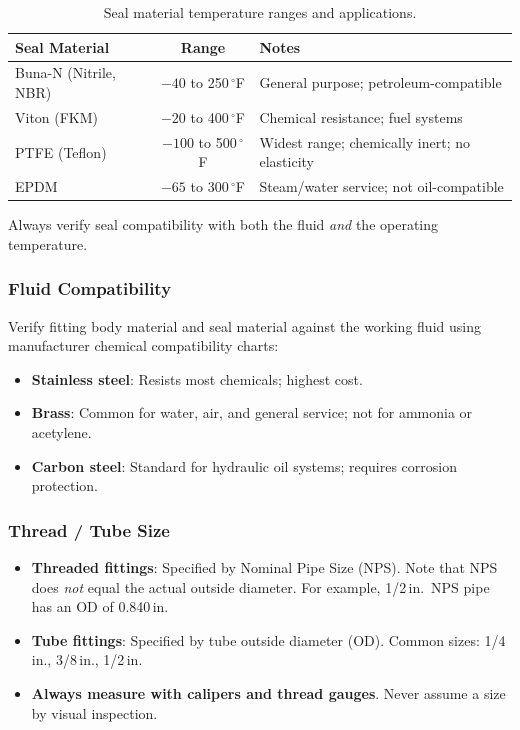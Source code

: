 \documentclass[11pt,letterpaper,twoside,openany]{book}
\begin{document}
\begin{table}[htbp]
\centering
\small
\begin{tabularx}{\textwidth}{l c X}
  \toprule
  \textbf{Seal Material} & \textbf{Range} & \textbf{Notes} \\
  \midrule
  Buna-N (Nitrile, NBR) & $-40$ to 250\,$^{\circ}$F & General purpose; petroleum-compatible \\
  Viton (FKM) & $-20$ to 400\,$^{\circ}$F & Chemical resistance; fuel systems \\
  PTFE (Teflon) & $-100$ to 500\,$^{\circ}$F & Widest range; chemically inert; no elasticity \\
  EPDM & $-65$ to 300\,$^{\circ}$F & Steam/water service; not oil-compatible \\
  \bottomrule
\end{tabularx}
\caption{Seal material temperature ranges and applications.}
\end{table}

Always verify seal compatibility with both the fluid \emph{and} the operating temperature.

\subsubsection{Fluid Compatibility}

Verify fitting body material and seal material against the working fluid using manufacturer chemical compatibility charts:
\begin{itemize}[nosep,leftmargin=1.5em]
  \item \textbf{Stainless steel}: Resists most chemicals; highest cost.
  \item \textbf{Brass}: Common for water, air, and general service; not for ammonia or acetylene.
  \item \textbf{Carbon steel}: Standard for hydraulic oil systems; requires corrosion protection.
\end{itemize}

\subsubsection{Thread / Tube Size}

\begin{itemize}[nosep,leftmargin=1.5em]
  \item \textbf{Threaded fittings}: Specified by Nominal Pipe Size (NPS). Note that NPS does \emph{not} equal the actual outside diameter. For example, 1/2\,in.\ NPS pipe has an OD of 0.840\,in.
  \item \textbf{Tube fittings}: Specified by tube outside diameter (OD). Common sizes: 1/4\,in., 3/8\,in., 1/2\,in.
  \item \textbf{Always measure with calipers and thread gauges}. Never assume a size by visual inspection.
\end{itemize}
\end{document}
